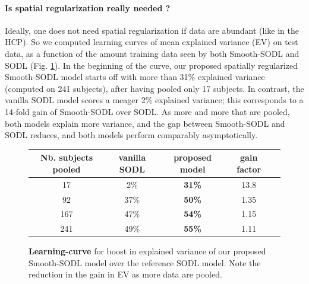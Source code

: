         
\paragraph{Is spatial regularization really needed ?}
Ideally, one does not need spatial regularization if data are abundant (like in the HCP). So we computed learning curves of mean explained variance (EV) on test data, as a function of the amount training data seen by both Smooth-SODL and SODL  \cite{mairal2010} (Fig. \ref{fig:ev}).
In the beginning of the curve, our proposed spatially regularized Smooth-SODL model starts off with more than 31\% explained variance (computed on 241 subjects), after having pooled only 17 subjects. In contrast, the vanilla SODL model  \cite{mairal2010} scores a meager 2\% explained variance; this corresponds  to a 14-fold gain of Smooth-SODL over SODL. As more and more that are pooled, both models explain more variance, and the gap between Smooth-SODL and SODL reduces, and both models perform comparably asymptotically. %

\begin{figure}[!htp]
 \begin{tabular}{|c|c|c|c|c}\hline%
    {Nb. subjects pooled} & {vanilla SODL} & {proposed model} & {gain factor} \\ \hline
17 & {2\%} & \bf{31\%} & {13.8}\\\hline
92 & 37\% & \bf{50\%} & 1.35\\\hline
167 & 47\% & \bf{54\%} & 1.15\\\hline
241 & 49\% & \bf{55\%} & 1.11\\
  \end{tabular}
 \caption{\textbf{Learning-curve} for boost in explained variance of our proposed Smooth-SODL model over the reference SODL model.
   Note the reduction in the gain in EV as more data are pooled.}
 \label{fig:ev}
\end{figure}



